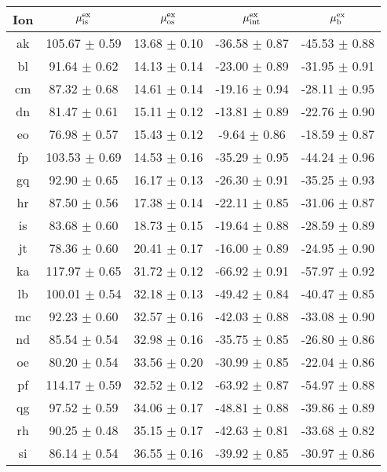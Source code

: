 \begin{table}
 \begin{center}
 \begin{tabular}{ccccc}
  \hline
  \hline
   Ion &   $\mu^{\mathrm{ex}}_{\mathrm{is}}$  &   $\mu^{\mathrm{ex}}_{\mathrm{os}}$  &   $\mu^{\mathrm{ex}}_{\mathrm{int}}$  &   $\mu^{\mathrm{ex}}_{\mathrm{b}}$  \\
  \hline
ak	&	105.67	$\pm$	0.59	&	13.68	$\pm$	0.10	&	-36.58	$\pm$	0.87	&	-45.53	$\pm$	0.88	\\
bl	&	91.64	$\pm$	0.62	&	14.13	$\pm$	0.14	&	-23.00	$\pm$	0.89	&	-31.95	$\pm$	0.91	\\
cm	&	87.32	$\pm$	0.68	&	14.61	$\pm$	0.14	&	-19.16	$\pm$	0.94	&	-28.11	$\pm$	0.95	\\
dn	&	81.47	$\pm$	0.61	&	15.11	$\pm$	0.12	&	-13.81	$\pm$	0.89	&	-22.76	$\pm$	0.90	\\
eo	&	76.98	$\pm$	0.57	&	15.43	$\pm$	0.12	&	-9.64	$\pm$	0.86	&	-18.59	$\pm$	0.87	\\
fp	&	103.53	$\pm$	0.69	&	14.53	$\pm$	0.16	&	-35.29	$\pm$	0.95	&	-44.24	$\pm$	0.96	\\
gq	&	92.90	$\pm$	0.65	&	16.17	$\pm$	0.13	&	-26.30	$\pm$	0.91	&	-35.25	$\pm$	0.93	\\
hr	&	87.50	$\pm$	0.56	&	17.38	$\pm$	0.14	&	-22.11	$\pm$	0.85	&	-31.06	$\pm$	0.87	\\
is	&	83.68	$\pm$	0.60	&	18.73	$\pm$	0.15	&	-19.64	$\pm$	0.88	&	-28.59	$\pm$	0.89	\\
jt	&	78.36	$\pm$	0.60	&	20.41	$\pm$	0.17	&	-16.00	$\pm$	0.89	&	-24.95	$\pm$	0.90	\\
ka	&	117.97	$\pm$	0.65	&	31.72	$\pm$	0.12	&	-66.92	$\pm$	0.91	&	-57.97	$\pm$	0.92	\\
lb	&	100.01	$\pm$	0.54	&	32.18	$\pm$	0.13	&	-49.42	$\pm$	0.84	&	-40.47	$\pm$	0.85	\\
mc	&	92.23	$\pm$	0.60	&	32.57	$\pm$	0.16	&	-42.03	$\pm$	0.88	&	-33.08	$\pm$	0.90	\\
nd	&	85.54	$\pm$	0.54	&	32.98	$\pm$	0.16	&	-35.75	$\pm$	0.85	&	-26.80	$\pm$	0.86	\\
oe	&	80.20	$\pm$	0.54	&	33.56	$\pm$	0.20	&	-30.99	$\pm$	0.85	&	-22.04	$\pm$	0.86	\\
pf	&	114.17	$\pm$	0.59	&	32.52	$\pm$	0.12	&	-63.92	$\pm$	0.87	&	-54.97	$\pm$	0.88	\\
qg	&	97.52	$\pm$	0.59	&	34.06	$\pm$	0.17	&	-48.81	$\pm$	0.88	&	-39.86	$\pm$	0.89	\\
rh	&	90.25	$\pm$	0.48	&	35.15	$\pm$	0.17	&	-42.63	$\pm$	0.81	&	-33.68	$\pm$	0.82	\\
si	&	86.14	$\pm$	0.54	&	36.55	$\pm$	0.16	&	-39.92	$\pm$	0.85	&	-30.97	$\pm$	0.86	\\

\end{tabular}
\end{center}
\end{table}
